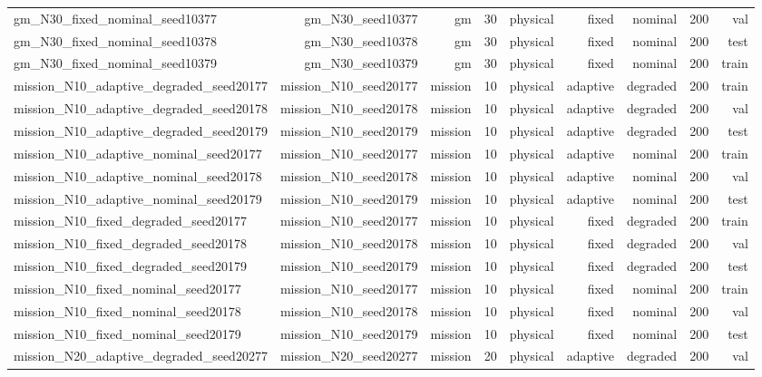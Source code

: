 \begin{tabular}{lrrrrrrrr}
gm\_N30\_fixed\_nominal\_seed10377 & gm\_N30\_seed10377 & gm & 30 & physical & fixed & nominal & 200 & val \\
gm\_N30\_fixed\_nominal\_seed10378 & gm\_N30\_seed10378 & gm & 30 & physical & fixed & nominal & 200 & test \\
gm\_N30\_fixed\_nominal\_seed10379 & gm\_N30\_seed10379 & gm & 30 & physical & fixed & nominal & 200 & train \\
mission\_N10\_adaptive\_degraded\_seed20177 & mission\_N10\_seed20177 & mission & 10 & physical & adaptive & degraded & 200 & train \\
mission\_N10\_adaptive\_degraded\_seed20178 & mission\_N10\_seed20178 & mission & 10 & physical & adaptive & degraded & 200 & val \\
mission\_N10\_adaptive\_degraded\_seed20179 & mission\_N10\_seed20179 & mission & 10 & physical & adaptive & degraded & 200 & test \\
mission\_N10\_adaptive\_nominal\_seed20177 & mission\_N10\_seed20177 & mission & 10 & physical & adaptive & nominal & 200 & train \\
mission\_N10\_adaptive\_nominal\_seed20178 & mission\_N10\_seed20178 & mission & 10 & physical & adaptive & nominal & 200 & val \\
mission\_N10\_adaptive\_nominal\_seed20179 & mission\_N10\_seed20179 & mission & 10 & physical & adaptive & nominal & 200 & test \\
mission\_N10\_fixed\_degraded\_seed20177 & mission\_N10\_seed20177 & mission & 10 & physical & fixed & degraded & 200 & train \\
mission\_N10\_fixed\_degraded\_seed20178 & mission\_N10\_seed20178 & mission & 10 & physical & fixed & degraded & 200 & val \\
mission\_N10\_fixed\_degraded\_seed20179 & mission\_N10\_seed20179 & mission & 10 & physical & fixed & degraded & 200 & test \\
mission\_N10\_fixed\_nominal\_seed20177 & mission\_N10\_seed20177 & mission & 10 & physical & fixed & nominal & 200 & train \\
mission\_N10\_fixed\_nominal\_seed20178 & mission\_N10\_seed20178 & mission & 10 & physical & fixed & nominal & 200 & val \\
mission\_N10\_fixed\_nominal\_seed20179 & mission\_N10\_seed20179 & mission & 10 & physical & fixed & nominal & 200 & test \\
mission\_N20\_adaptive\_degraded\_seed20277 & mission\_N20\_seed20277 & mission & 20 & physical & adaptive & degraded & 200 & val \\

\end{tabular}
